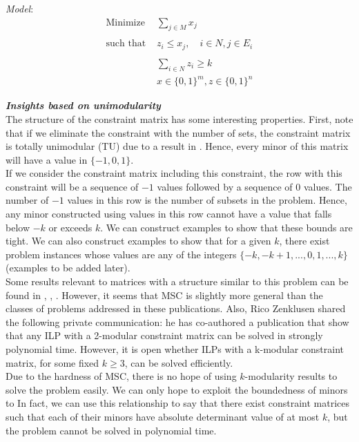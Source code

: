 \documentclass[12pt]{article}
\newcommand{\bin}{\{0,1\}}
\newcommand{\subheading}[1]{\emph{\textbf{#1}}}
\begin{document}
\textit{Model}:
\begin{align*}
\text{Minimize }  & \sum_{j \in M} x_j\\
                  & \\
\text{such that } & z_i \leq x_j, \quad i \in N,j \in E_i\\
                  & \\
                  & \sum_{i \in N} z_i \geq k\\
                  & x \in \bin^m,z \in \bin^n
\end{align*}

\subheading{Insights based on unimodularity}\\

The structure of the constraint matrix has some interesting properties. First, note that if we eliminate the constraint with the number of sets, the constraint matrix is totally unimodular (TU) due to a result in \cite{nemhauser1988integer}. Hence, every minor of this matrix will have a value in $\{-1, 0, 1\}$.\\

If we consider the constraint matrix including this constraint, the row with this constraint will be a sequence of $-1$ values followed by a sequence of $0$ values. The number of $-1$ values in this row is the number of subsets in the problem. Hence, any minor constructed using values in this row cannot have a value that falls below $-k$ or exceeds $k$. We can construct examples to show that these bounds are tight. We can also construct examples to show that for a given $k$, there exist problem instances whose values are any of the integers $\{-k, -k+1, ..., 0, 1, ..., k\}$ (examples to be added later).\\

Some results relevant to matrices with a structure similar to this problem can be found in \cite{gribanov2013integer}, \cite{gribanov2015integer}, \cite{kotnyek2002generalization}. However, it seems that MSC is slightly more general than the classes of problems addressed in these publications. Also, Rico Zenklusen shared the following private communication: he has co-authored a publication that show that  any ILP with a 2-modular constraint matrix can be solved in strongly polynomial time. However, it is open whether ILPs with a k-modular constraint matrix, for some fixed $k \geq 3$, can be solved efficiently.\\

Due to the hardness of MSC, there is no hope of using $k$-modularity results to solve the problem easily. We can only hope to exploit the boundedness of minors to In fact, we can use this relationship to say that there exist constraint matrices such that each of their minors have absolute determinant value of at most $k$, but the problem cannot be solved in polynomial time.\\
\end{document}

